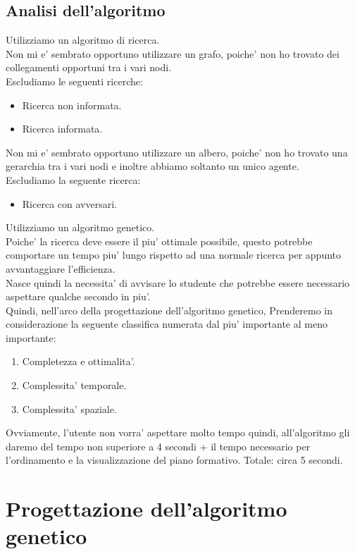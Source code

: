 \documentclass[10pt,a4paper]{article}
\begin{document}
   
    \subsection{Analisi dell'algoritmo}
      \label{analisiDellAlgoritmoSubsection}
      Utilizziamo un algoritmo di ricerca.\\
      Non mi e' sembrato opportuno utilizzare un grafo, poiche' non ho trovato dei collegamenti opportuni 
      tra i vari nodi.\\
      Escludiamo le seguenti ricerche:
      \begin{itemize}
        \item Ricerca non informata.
        \item Ricerca informata.
      \end{itemize}
      Non mi e' sembrato opportuno utilizzare un albero, poiche' non ho trovato una gerarchia tra i vari nodi e 
      inoltre abbiamo soltanto un unico agente.\\
      Escludiamo la seguente ricerca:
      \begin{itemize}
        \item Ricerca con avversari.
      \end{itemize}
      Utilizziamo un algoritmo genetico.\\
      Poiche' la ricerca deve essere il piu' ottimale possibile, questo 
      potrebbe comportare un tempo piu' lungo rispetto ad una normale ricerca per appunto avvantaggiare l'efficienza.\\
      Nasce quindi la necessita' di avvisare lo studente che potrebbe essere necessario aspettare qualche secondo in piu'.\\
      Quindi, nell'arco della progettazione dell'algoritmo genetico, Prenderemo in considerazione la 
      seguente classifica numerata dal piu' importante al meno importante:
      \begin{enumerate}
        \item Completezza e ottimalita'.
        \item Complessita' temporale.
        \item Complessita' spaziale.
      \end{enumerate}
      Ovviamente, l'utente non vorra' aspettare molto tempo quindi, all'algoritmo gli daremo del tempo 
      non superiore a 4 secondi + il tempo necessario per l'ordinamento e la visualizzazione del piano formativo. Totale: circa 5 secondi.
        
    \section{Progettazione dell'algoritmo genetico}
    \label{progettazioneDellAlgoritmoGeneticoSection}
    
\end{document}
